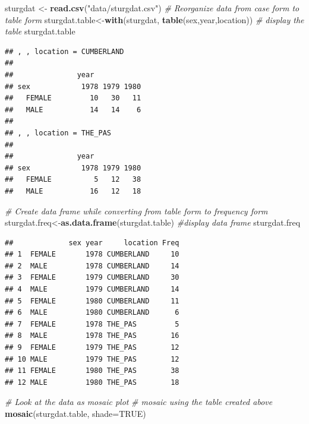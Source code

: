 \documentclass[12pt,]{book}
\newenvironment{Shaded}{\begin{snugshade}}{\end{snugshade}}
\newcommand{\CommentTok}[1]{\textcolor[rgb]{0.56,0.35,0.01}{\textit{#1}}}
\newcommand{\DataTypeTok}[1]{\textcolor[rgb]{0.13,0.29,0.53}{#1}}
\newcommand{\KeywordTok}[1]{\textcolor[rgb]{0.13,0.29,0.53}{\textbf{#1}}}
\newcommand{\NormalTok}[1]{#1}
\newcommand{\OtherTok}[1]{\textcolor[rgb]{0.56,0.35,0.01}{#1}}
\newcommand{\StringTok}[1]{\textcolor[rgb]{0.31,0.60,0.02}{#1}}
\begin{document}
\begin{Shaded}
\begin{Highlighting}[]
\NormalTok{sturgdat <-}\StringTok{ }\KeywordTok{read.csv}\NormalTok{(}\StringTok{"data/sturgdat.csv"}\NormalTok{)}
\CommentTok{# Reorganize data from case form to table form}
\NormalTok{sturgdat.table<-}\KeywordTok{with}\NormalTok{(sturgdat, }\KeywordTok{table}\NormalTok{(sex,year,location))}
\CommentTok{# display the table}
\NormalTok{sturgdat.table}
\end{Highlighting}
\end{Shaded}

\begin{verbatim}
## , , location = CUMBERLAND  
## 
##               year
## sex            1978 1979 1980
##   FEMALE         10   30   11
##   MALE           14   14    6
## 
## , , location = THE_PAS     
## 
##               year
## sex            1978 1979 1980
##   FEMALE          5   12   38
##   MALE           16   12   18
\end{verbatim}

\begin{Shaded}
\begin{Highlighting}[]
\CommentTok{# Create data frame while converting from table form to frequency form}
\NormalTok{sturgdat.freq<-}\KeywordTok{as.data.frame}\NormalTok{(sturgdat.table)}
\CommentTok{#display data frame}
\NormalTok{sturgdat.freq}
\end{Highlighting}
\end{Shaded}

\begin{verbatim}
##             sex year     location Freq
## 1  FEMALE       1978 CUMBERLAND     10
## 2  MALE         1978 CUMBERLAND     14
## 3  FEMALE       1979 CUMBERLAND     30
## 4  MALE         1979 CUMBERLAND     14
## 5  FEMALE       1980 CUMBERLAND     11
## 6  MALE         1980 CUMBERLAND      6
## 7  FEMALE       1978 THE_PAS         5
## 8  MALE         1978 THE_PAS        16
## 9  FEMALE       1979 THE_PAS        12
## 10 MALE         1979 THE_PAS        12
## 11 FEMALE       1980 THE_PAS        38
## 12 MALE         1980 THE_PAS        18
\end{verbatim}

\begin{Shaded}
\begin{Highlighting}[]
\CommentTok{# Look at the data as mosaic plot}
\CommentTok{# mosaic using the table created above}
\KeywordTok{mosaic}\NormalTok{(sturgdat.table, }\DataTypeTok{shade=}\OtherTok{TRUE}\NormalTok{)}
\end{Highlighting}
\end{Shaded}
\end{document}
